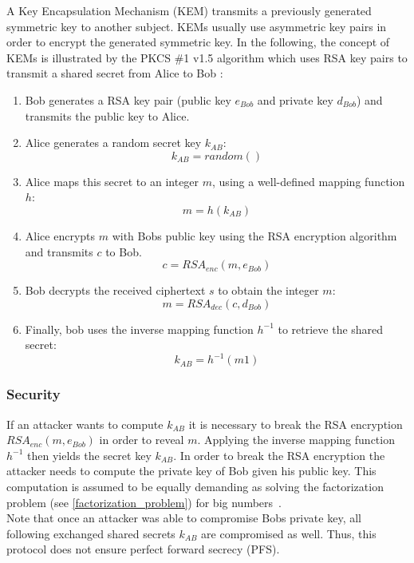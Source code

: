 A Key Encapsulation Mechanism (KEM) transmits a previously generated symmetric key to another subject. KEMs usually use asymmetric key pairs in order to encrypt the generated symmetric key. In the following, the concept of KEMs is illustrated by the PKCS \#1 v1.5 algorithm which uses \gls{RSA} key pairs to transmit a shared secret from Alice to Bob \parencite{rsakem}:

\begin{enumerate}
\item Bob generates a \gls{RSA} key pair (public key $e_{Bob}$ and private key $d_{Bob}$) and transmits the public key to Alice.
\item Alice generates a random secret key $k_{AB}$:
\begin{equation*}
k_{AB} = random()
\end{equation*}
\item Alice maps this secret to an integer $m$, using a well-defined mapping function $h$:
\begin{equation*}
m = h(k_{AB})
\end{equation*}
\item Alice encrypts $m$ with Bobs public key using the \gls{RSA} encryption algorithm and transmits $c$ to Bob.
\begin{equation*}
c = RSA_{enc}(m, e_{Bob})
\end{equation*}
\item Bob decrypts the received ciphertext $s$ to obtain the integer $m$:
\begin{equation*}
m = RSA_{dec}(c, d_{Bob})
\end{equation*}
\item Finally, bob uses the inverse mapping function $h^{-1}$ to retrieve the shared secret:
\begin{equation*}
k_{AB} = h^{-1}(m1)
\end{equation*}

\end{enumerate}

\subsubsection{Security}
If an attacker wants to compute $k_{AB}$ it is necessary to break the \gls{RSA} encryption $RSA_{enc}(m, e_{Bob})$ in order to reveal $m$. Applying the inverse mapping function $h^{-1}$ then yields the secret key $k_{AB}$. In order to break the \gls{RSA} encryption the attacker needs to compute the private key of Bob given his public key. This computation is assumed to be equally demanding as solving the factorization problem (see \autoref{factorization_problem}) for big numbers~\parencite{rsa2005problem}.\\
Note that once an attacker was able to compromise Bobs private key, all following exchanged shared secrets $k_{AB}$ are compromised as well. Thus, this protocol does not ensure perfect forward secrecy (\gls{PFS}).


